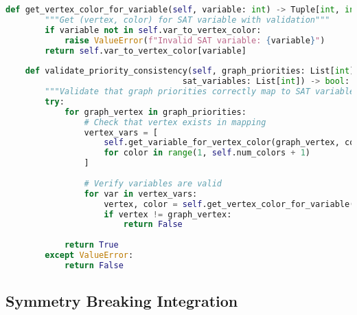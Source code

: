 \begin{lstlisting}[language=Python, caption=Variable Indexing Consistency for Reliable Operation]
    def get_vertex_color_for_variable(self, variable: int) -> Tuple[int, int]:
        """Get (vertex, color) for SAT variable with validation"""
        if variable not in self.var_to_vertex_color:
            raise ValueError(f"Invalid SAT variable: {variable}")
        return self.var_to_vertex_color[variable]
    
    def validate_priority_consistency(self, graph_priorities: List[int], 
                                    sat_variables: List[int]) -> bool:
        """Validate that graph priorities correctly map to SAT variables"""
        try:
            for graph_vertex in graph_priorities:
                # Check that vertex exists in mapping
                vertex_vars = [
                    self.get_variable_for_vertex_color(graph_vertex, color)
                    for color in range(1, self.num_colors + 1)
                ]
                
                # Verify variables are valid
                for var in vertex_vars:
                    vertex, color = self.get_vertex_color_for_variable(var)
                    if vertex != graph_vertex:
                        return False
            
            return True
        except ValueError:
            return False
\end{lstlisting}

\subsection{Symmetry Breaking Integration}
\label{appendix:symmetry-integration}


